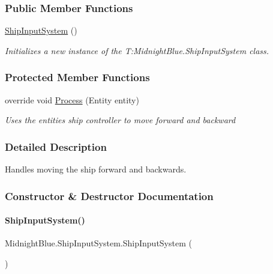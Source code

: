 \subsubsection*{Public Member Functions}
\begin{DoxyCompactItemize}
\item 
\hyperlink{class_midnight_blue_1_1_ship_input_system_ad7f804f91939a651c8e53ddb6bf55db6}{Ship\+Input\+System} ()
\begin{DoxyCompactList}\small\item\em Initializes a new instance of the T\+:\+Midnight\+Blue.\+Ship\+Input\+System class. \end{DoxyCompactList}\end{DoxyCompactItemize}
\subsubsection*{Protected Member Functions}
\begin{DoxyCompactItemize}
\item 
override void \hyperlink{class_midnight_blue_1_1_ship_input_system_ac504beb5b6afa47ca4618d9683e46946}{Process} (Entity entity)
\begin{DoxyCompactList}\small\item\em Uses the entities ship controller to move forward and backward \end{DoxyCompactList}\end{DoxyCompactItemize}


\subsubsection{Detailed Description}
Handles moving the ship forward and backwards. 



\subsubsection{Constructor \& Destructor Documentation}
\hypertarget{class_midnight_blue_1_1_ship_input_system_ad7f804f91939a651c8e53ddb6bf55db6}{}\label{class_midnight_blue_1_1_ship_input_system_ad7f804f91939a651c8e53ddb6bf55db6} 
\paragraph{\texorpdfstring{Ship\+Input\+System()}{ShipInputSystem()}}
{\footnotesize\ttfamily Midnight\+Blue.\+Ship\+Input\+System.\+Ship\+Input\+System (\begin{DoxyParamCaption}{ }\end{DoxyParamCaption})\hspace{0.3cm}{\ttfamily [inline]}}



